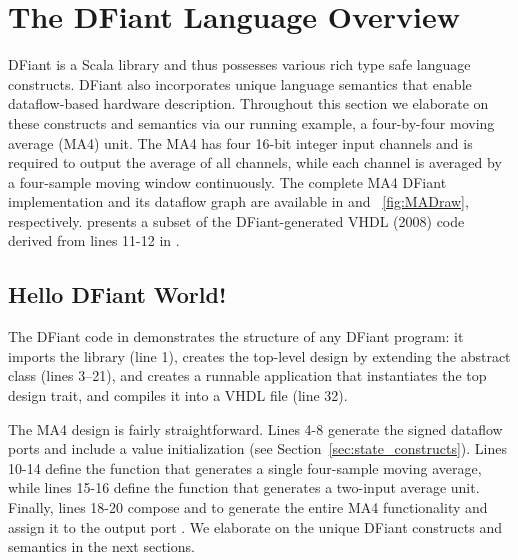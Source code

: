 \begin{table}[t!]
\label{fig:MADraw}
\end{table}

\section{The DFiant Language Overview}
\label{sec:dfiant}
DFiant is a Scala library and thus possesses various rich type safe language constructs. DFiant also incorporates unique language semantics that enable dataflow-based hardware description. Throughout this section we elaborate on these constructs and semantics via our running example, a four-by-four moving average (MA4) unit. The MA4 has four 16-bit integer input channels and is required to output the average of all channels, while each channel is averaged by a four-sample moving window continuously. The complete MA4 DFiant implementation and its dataflow graph are available in  and ~\ref{fig:MADraw}, respectively.  presents a subset of the DFiant-generated VHDL (2008) code derived from lines 11-12 in .


\subsection{Hello DFiant World!}
The DFiant code in  demonstrates the structure of any DFiant program: it imports the  library (line 1), creates the top-level design by extending the  abstract class (lines 3--21), and creates a runnable application that instantiates the top design trait, and compiles it into a VHDL file (line 32).

The MA4 design is fairly straightforward. Lines 4-8 generate the signed dataflow ports and include a  value initialization (see Section~\ref{sec:state_constructs}). 
Lines 10-14 define the function  that generates a single four-sample moving average, while lines 15-16 define the function  that generates a two-input average unit. Finally, lines 18-20 compose  and  to generate the entire MA4 functionality and assign it to the output port . We elaborate on the unique DFiant constructs and semantics in the next sections.


